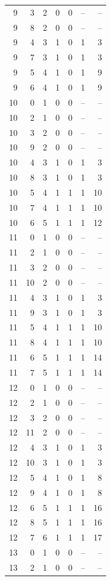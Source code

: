 \begin{longtable}{rrrrrrr}
9 & 3 & 2 & 0 & 0 & -- & --\\
9 & 8 & 2 & 0 & 0 & -- & --\\
9 & 4 & 3 & 1 & 0 & 1 & 3\\
9 & 7 & 3 & 1 & 0 & 1 & 3\\
9 & 5 & 4 & 1 & 0 & 1 & 9\\
9 & 6 & 4 & 1 & 0 & 1 & 9\\
10 & 0 & 1 & 0 & 0 & -- & --\\
10 & 2 & 1 & 0 & 0 & -- & --\\
10 & 3 & 2 & 0 & 0 & -- & --\\
10 & 9 & 2 & 0 & 0 & -- & --\\
10 & 4 & 3 & 1 & 0 & 1 & 3\\
10 & 8 & 3 & 1 & 0 & 1 & 3\\
10 & 5 & 4 & 1 & 1 & 1 & 10\\
10 & 7 & 4 & 1 & 1 & 1 & 10\\
10 & 6 & 5 & 1 & 1 & 1 & 12\\
11 & 0 & 1 & 0 & 0 & -- & --\\
11 & 2 & 1 & 0 & 0 & -- & --\\
11 & 3 & 2 & 0 & 0 & -- & --\\
11 & 10 & 2 & 0 & 0 & -- & --\\
11 & 4 & 3 & 1 & 0 & 1 & 3\\
11 & 9 & 3 & 1 & 0 & 1 & 3\\
11 & 5 & 4 & 1 & 1 & 1 & 10\\
11 & 8 & 4 & 1 & 1 & 1 & 10\\
11 & 6 & 5 & 1 & 1 & 1 & 14\\
11 & 7 & 5 & 1 & 1 & 1 & 14\\
12 & 0 & 1 & 0 & 0 & -- & --\\
12 & 2 & 1 & 0 & 0 & -- & --\\
12 & 3 & 2 & 0 & 0 & -- & --\\
12 & 11 & 2 & 0 & 0 & -- & --\\
12 & 4 & 3 & 1 & 0 & 1 & 3\\
12 & 10 & 3 & 1 & 0 & 1 & 3\\
12 & 5 & 4 & 1 & 0 & 1 & 8\\
12 & 9 & 4 & 1 & 0 & 1 & 8\\
12 & 6 & 5 & 1 & 1 & 1 & 16\\
12 & 8 & 5 & 1 & 1 & 1 & 16\\
12 & 7 & 6 & 1 & 1 & 1 & 17\\
13 & 0 & 1 & 0 & 0 & -- & --\\
13 & 2 & 1 & 0 & 0 & -- & --\\

\end{longtable}
